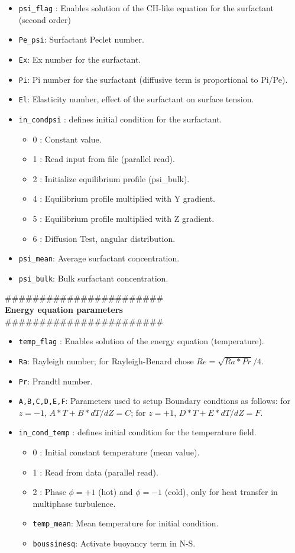 \begin{itemize}[label={$\circ$}]
\item \texttt{psi\_flag} : Enables solution of the CH-like equation for the surfactant (second order)
\item \texttt{Pe\_psi}: Surfactant Peclet number.
\item \texttt{Ex}: Ex number for the surfactant.
\item \texttt{Pi}: Pi number for the surfactant (diffusive term is proportional to Pi/Pe).
\item \texttt{El}: Elasticity number, effect of the surfactant on surface tension.
\item \texttt{in\_condpsi} : defines initial condition for the surfactant.
\begin{itemize}[label={$\circ$}]
\item 0 : Constant value.
\item 1 : Read input from file (parallel read).
\item 2 : Initialize equilibrium profile (psi\_bulk).
\item 4 : Equilibrium profile multiplied with Y gradient.
\item 5 : Equilibrium profile multiplied with Z gradient.
\item 6 : Diffusion Test, angular distribution.
\end{itemize}
\item \texttt{psi\_mean}: Average surfactant concentration.
\item \texttt{psi\_bulk}: Bulk surfactant concentration.
\end{itemize}
\#\#\#\#\#\#\#\#\#\#\#\#\#\#\#\#\#\#\#\#\#\#\#\\
{\bf Energy equation parameters}\\
\#\#\#\#\#\#\#\#\#\#\#\#\#\#\#\#\#\#\#\#\#\#\#
\begin{itemize}[label={$\circ$}]
\item \texttt{temp\_flag} : Enables solution of the energy equation (temperature).
\item \texttt{Ra}: Rayleigh number; for Rayleigh-Benard chose $Re=\sqrt{Ra*Pr}/4$.
\item \texttt{Pr}: Prandtl number.
\item \texttt{A,B,C,D,E,F}: Parameters used to setup Boundary condtions as follows: for $z=-1$, $A*T + B*dT/dZ=C$; for $z=+1$, $D*T + E*dT/dZ=F$. 
\item \texttt{in\_cond\_temp} : defines initial condition for the temperature field.
\begin{itemize}[label={$\circ$}]
\item 0 : Initial constant temperature (mean value).
\item 1 : Read from data (parallel read).
\item 2 : Phase $\phi=+1$ (hot) and $\phi=-1$ (cold), only for heat transfer in multiphase turbulence.
\item \texttt{temp\_mean}: Mean temperature for initial condition.
\item \texttt{boussinesq}: Activate buoyancy term in N-S.
\end{itemize}
\end{itemize}
